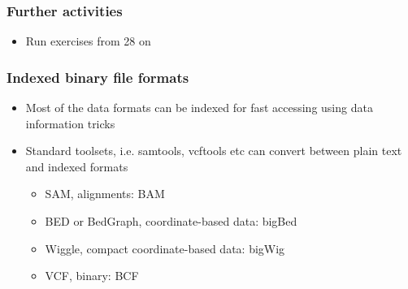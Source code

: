 \documentclass{beamer}
\begin{document}
















\begin{frame}
  \frametitle{Further activities}
  \begin{itemize}
  \item Run exercises from 28 on
  \end{itemize}
\end{frame}


\begin{frame}
  \frametitle{Indexed binary file formats}

  \begin{itemize}
  \item Most of the data formats can be indexed for fast accessing using data information tricks
  \item Standard toolsets, i.e. samtools, vcftools etc can convert between plain text and indexed formats

    \begin{itemize}
    \item SAM, alignments: BAM
    \item BED or BedGraph, coordinate-based data: bigBed
    \item Wiggle, compact coordinate-based data: bigWig
    \item VCF, binary: BCF
    \end{itemize}
  \end{itemize}

\end{frame}
\end{document}

